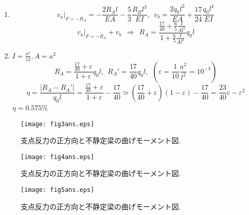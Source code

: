 \documentclass[10pt,a4j]{jarticle}
\begin{document}
\begin{enumerate}
\begin{equation}
		\right.
		, \ \
		\int_0^l 
			M_i \tilde{M}_i dx_i = 
		\left\{
		\begin{array}{cc}
			\frac{1}{8}q_0l^4 & (i=1) \\
			\frac{1}{2}q_0l^4 & (i=2) \\
			\frac{1}{12}q_0l^4 & (i=3) \\
			0 & (i=4)
		\end{array}
		\right.
	\end{equation}
	\begin{equation}
		v_b=
		\sum_{i=1}^4
		\int_0^l \left( \frac{N_i\tilde{N}_i}{EA} + \frac{M_i\tilde{M}_i}{EI} \right) dx_i
		=
		\frac{2q_0l^2}{EA} + \frac{17}{24}\frac{q_0l^4}{EI}
		\label{eqn:}
	\end{equation}
\item
	\begin{equation}
		\left. v_a\right|_{F=-R_A}= -\frac{2R_Al}{EA} - \frac{5}{3}\frac{R_Bl^3}{EI}, \ \ 
		v_b= \frac{2q_0l^2}{EA} + \frac{17}{24}\frac{q_0l^4}{EI}
		\label{eqn:}
	\end{equation}
	\begin{equation}
		\left. v_a\right|_{F=-R_A}+ v_b
		\ \ \Rightarrow \ \ 
		R_A=\frac
		{\frac{17}{40}+\frac{6}{5}\frac{I}{Al^2}}
		{1+\frac{6}{5}\frac{I}{Al^2}}q_0l
		\label{eqn:}
	\end{equation}
\item
	$I=\frac{a^4}{12},A=a^2$
	\begin{equation}
		R_A=\frac{\frac{17}{40}+\varepsilon}{1+\varepsilon}q_0l, \ \ 
		R_A'=\frac{17}{40}q_0l, \ \ \left(\varepsilon=\frac{1}{10}\frac{a^2}{l^2}=10^{-3}\right)
		\label{eqn:}
	\end{equation}
	\begin{equation}
		\eta=\frac{\left| R_A-R_A'\right|}{q_0l}=\frac{\frac{17}{40}+\varepsilon}{1+\varepsilon}-\frac{17}{40}
		\simeq 
		\left(\frac{17}{40}+\varepsilon \right) (1-\varepsilon) -\frac{17}{40}
		=\frac{23}{40}\varepsilon -\varepsilon^2
		\label{eqn:}
	\end{equation}
	$\eta=0.575$\%
\end{enumerate}
\begin{figure}
	\begin{center}
	\texttt{[image: fig3ans.eps]} 
	\end{center}
	\caption{支点反力の正方向と不静定梁の曲げモーメント図.}
	\label{fig:fig4}
\end{figure}
\begin{figure}
	\begin{center}
	\texttt{[image: fig4ans.eps]} 
	\end{center}
	\caption{支点反力の正方向と不静定梁の曲げモーメント図.}
	\label{fig:fig5}
\end{figure}
\begin{figure}
	\begin{center}
	\texttt{[image: fig5ans.eps]} 
	\end{center}
	\caption{支点反力の正方向と不静定梁の曲げモーメント図.}
	\label{fig:fig6}
\end{figure}
\end{document}
